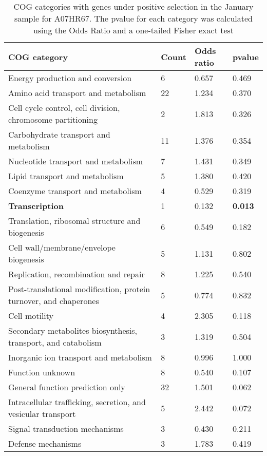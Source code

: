 \begin{table}[]
\footnotesize 
	\tabcolsep=0.11cm 
\caption{COG categories with genes under positive selection in the January sample for A07HR67. The pvalue for each category was calculated using the Odds Ratio and a one-tailed Fisher exact test} 
\begin{tabularx}{\textwidth}{L{6cm}R{2cm}R{2cm}R{2cm}} 
\hline 
\textbf{COG category} & \textbf{Count} & \textbf{Odds ratio} & \textbf{pvalue} \\ 
\hline 
Energy production and conversion & 6 & 0.657 & 0.469 \\ 
Amino acid transport and metabolism & 22 & 1.234 & 0.370 \\ 
Cell cycle control, cell division, chromosome partitioning & 2 & 1.813 & 0.326 \\ 
Carbohydrate transport and metabolism & 11 & 1.376 & 0.354 \\ 
Nucleotide transport and metabolism & 7 & 1.431 & 0.349 \\ 
Lipid transport and metabolism & 5 & 1.380 & 0.420 \\ 
Coenzyme transport and metabolism & 4 & 0.529 & 0.319 \\ 
\textbf{Transcription} & 1 & 0.132 & \textbf{0.013} \\ 
Translation, ribosomal structure and biogenesis & 6 & 0.549 & 0.182 \\ 
Cell wall/membrane/envelope biogenesis & 5 & 1.131 & 0.802 \\ 
Replication, recombination and repair & 8 & 1.225 & 0.540 \\ 
Post-translational modification, protein turnover, and chaperones & 5 & 0.774 & 0.832 \\ 
Cell motility & 4 & 2.305 & 0.118 \\ 
Secondary metabolites biosynthesis, transport, and catabolism & 3 & 1.319 & 0.504 \\ 
Inorganic ion transport and metabolism & 8 & 0.996 & 1.000 \\ 
Function unknown & 8 & 0.540 & 0.107 \\ 
General function prediction only & 32 & 1.501 & 0.062 \\ 
Intracellular trafficking, secretion, and vesicular transport & 5 & 2.442 & 0.072 \\ 
Signal transduction mechanisms & 3 & 0.430 & 0.211 \\ 
Defense mechanisms & 3 & 1.783 & 0.419 \\ 
\end{tabularx} 
\label{January_COG_Selection_A07HR67} 
 \end{table} 

